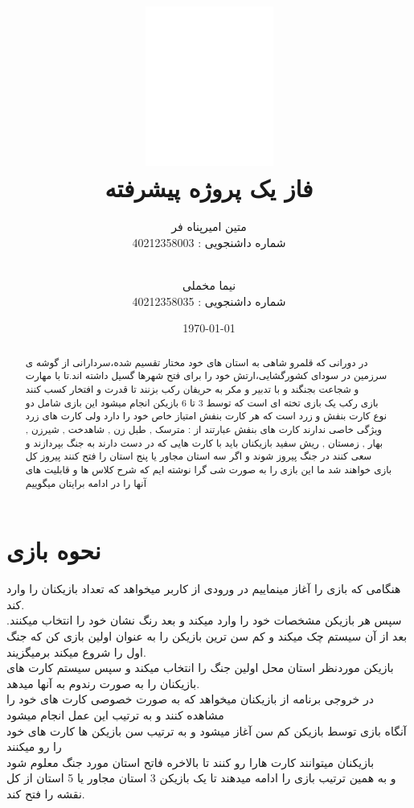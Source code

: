 \documentclass[pdf,titlepage,a4paper]{report}
\title{\includegraphics[scale=0.8]{Graphics/BASU_logo.png} \\ \Huge{فاز یک پروژه پیشرفته}}
\author{متین امیرپناه فر \\ شماره داشنجویی : 40212358003
		  \and \\ نیما مخملی \\ شماره داشنجویی : 40212358035}
\date{\today}
\begin{document}
	{\color{white}
	\maketitle}

	\tableofcontents

	\newpage

	\begin{abstract}
		
		در دورانی که قلمرو شاهی به استان های خود مختار تقسیم شده،سردارانی از گوشه ی سرزمین در سودای کشورگشایی،ارتش خود را برای فتح شهرها گسیل داشته اند.تا با مهارت و شجاعت بجنگند و با تدبیر و مکر به حریفان رکب بزنند تا قدرت و افتخار کسب کنند \\

     بازی رکب یک بازی تخته ای است که توسط 3 تا 6 بازیکن انجام میشود 
	 این بازی شامل دو نوع کارت بنفش و زرد است که هر کارت بنفش امتیاز خاص خود را دارد ولی کارت های زرد ویژگی خاصی ندارند
	 کارت های بنفش عبارتند از : مترسک , طبل زن , شاهدخت ,  شیرزن  ,  بهار  , زمستان , ریش سفید 
	 بازیکنان باید با کارت هایی که در دست دارند به جنگ بپردازند و سعی کنند در جنگ پیروز شوند و اگر سه استان مجاور یا پنج استان را فتح کنند پیروز کل بازی خواهند شد 
	 ما این بازی را به صورت شی گرا نوشته ایم که شرح کلاس ها و قابلیت های آنها را در ادامه برایتان میگوییم
	  
	\end{abstract}
    
	\newpage
    \part{نحوه بازی}
     هنگامی که بازی را آغاز مینماییم در ورودی از کاربر میخواهد که تعداد بازیکنان را وارد کند. \\
     \indent سپس هر بازیکن مشخصات خود را وارد میکند و بعد رنگ نشان خود را انتخاب میکنند.
	 بعد از آن سیستم چک میکند و کم سن ترین بازیکن را به عنوان اولین بازی کن که جنگ اول را شروع میکند برمیگزیند.\\
	 \indent بازیکن موردنظر استان محل اولین جنگ را انتخاب میکند و سپس سیستم کارت های بازیکنان را به صورت رندوم به آنها میدهد. \\
	 در خروجی برنامه از بازیکنان میخواهد که به صورت خصوصی کارت های خود را مشاهده کنند و به ترتیب این عمل انجام میشود\\
	 آنگاه بازی توسط بازیکن کم سن آغاز میشود و به ترتیب سن بازیکن ها کارت های خود را رو میکنند\\
	 بازیکنان میتوانند کارت هارا رو کنند تا بالاخره فاتح استان مورد جنگ معلوم شود\\
	 و به همین ترتیب بازی را ادامه میدهند تا یک بازیکن 3 استان مجاور یا 5 استان از کل نقشه را فتح کند.\\
	
\end{document}
